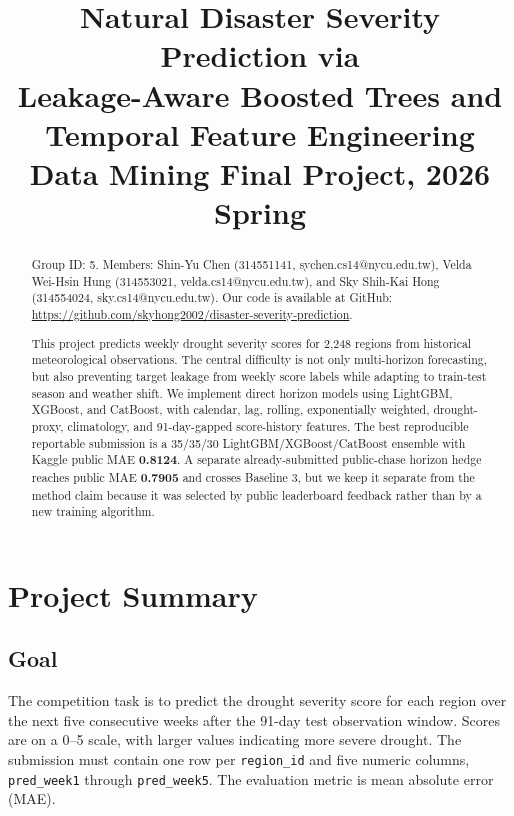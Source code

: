 \documentclass[conference]{IEEEtran}
\begin{document}
\title{Natural Disaster Severity Prediction via\\
Leakage-Aware Boosted Trees and Temporal Feature Engineering\\
{\footnotesize Data Mining Final Project, 2026 Spring}
}

\author{
\and
{}
\and
{}
}

\maketitle

\begin{abstract}
Group ID: 5. Members: Shin-Yu Chen (314551141,
sychen.cs14@nycu.edu.tw), Velda Wei-Hsin Hung (314553021,
velda.cs14@nycu.edu.tw), and Sky Shih-Kai Hong (314554024,
sky.cs14@nycu.edu.tw). Our code is available at GitHub:
\href{https://github.com/skyhong2002/disaster-severity-prediction}{\color{blue}https://github.com/skyhong2002/disaster-severity-prediction}.

This project predicts weekly drought severity scores for 2,248 regions from
historical meteorological observations. The central difficulty is not only
multi-horizon forecasting, but also preventing target leakage from weekly score
labels while adapting to train-test season and weather shift. We implement
direct horizon models using LightGBM, XGBoost, and CatBoost, with calendar,
lag, rolling, exponentially weighted, drought-proxy, climatology, and
91-day-gapped score-history features. The best reproducible reportable
submission is a 35/35/30 LightGBM/XGBoost/CatBoost ensemble with Kaggle public
MAE \textbf{0.8124}. A separate already-submitted public-chase horizon hedge
reaches public MAE \textbf{0.7905} and crosses Baseline 3, but we keep it
separate from the method claim because it was selected by public leaderboard
feedback rather than by a new training algorithm.
\end{abstract}

\section{Project Summary}

\subsection{Goal}
The competition task is to predict the drought severity score for each region
over the next five consecutive weeks after the 91-day test observation window.
Scores are on a 0--5 scale, with larger values indicating more severe drought.
The submission must contain one row per \texttt{region\_id} and five numeric
columns, \texttt{pred\_week1} through \texttt{pred\_week5}. The evaluation
metric is mean absolute error (MAE).
\end{document}
